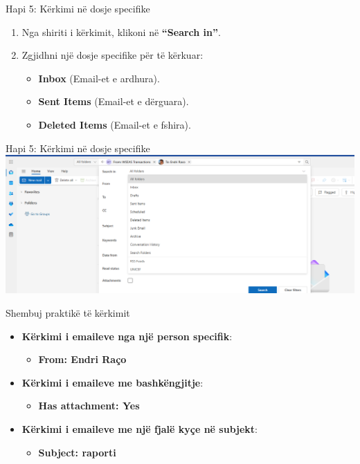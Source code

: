 \documentclass[
  ignorenonframetext,
]{beamer}
\providecommand{\tightlist}{%
  \setlength{\itemsep}{0pt}\setlength{\parskip}{0pt}}
\begin{document}
\begin{frame}{Hapi 5: Kërkimi në dosje specifike}
\label{hapi-5-kuxebrkimi-nuxeb-dosje-specifike}
\begin{enumerate}
\item
  Nga shiriti i kërkimit, klikoni në \textbf{``Search in''}.
\item
  Zgjidhni një dosje specifike për të kërkuar:

  \begin{itemize}
  \item
    \textbf{Inbox} (Email-et e ardhura).
  \item
    \textbf{Sent Items} (Email-et e dërguara).
  \item
    \textbf{Deleted Items} (Email-et e fshira).
  \end{itemize}
\end{enumerate}
\end{frame}

\begin{frame}{Hapi 5: Kërkimi në dosje specifike}
\label{hapi-5-kuxebrkimi-nuxeb-dosje-specifike-1}
\includegraphics{./images/outlook21.png}
\end{frame}

\begin{frame}{Shembuj praktikë të kërkimit}
\label{shembuj-praktikuxeb-tuxeb-kuxebrkimit}
\begin{itemize}
\item
  \textbf{Kërkimi i emaileve nga një person specifik}:

  \begin{itemize}
  \tightlist
  \item
    \textbf{From: Endri Raço}
  \end{itemize}
\item
  \textbf{Kërkimi i emaileve me bashkëngjitje}:

  \begin{itemize}
  \tightlist
  \item
    \textbf{Has attachment: Yes}
  \end{itemize}
\item
  \textbf{Kërkimi i emaileve me një fjalë kyçe në subjekt}:

  \begin{itemize}
  \tightlist
  \item
    \textbf{Subject: raporti}
  \end{itemize}
\end{itemize}
\end{frame}
\end{document}
